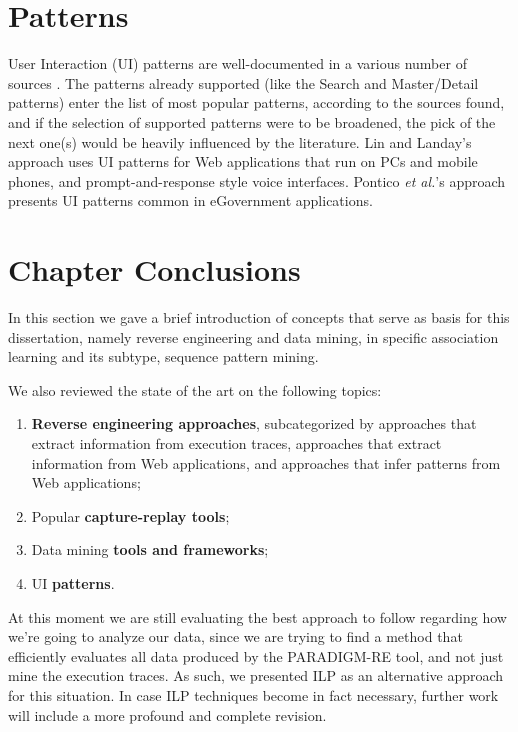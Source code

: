 \section{Patterns}\label{sec:patterns}
User Interaction (UI) patterns are well-documented in a various number of sources \cite{tidwell2010designing,van2001patterns, neil12standard,sinnig2005patterns}. The patterns already supported (like the Search and Master/Detail patterns) enter the list of most popular patterns, according to the sources found, and if the selection of supported patterns were to be broadened, the pick of the next one(s) would be heavily influenced by the literature. Lin and Landay's approach \cite{lin2008employing} uses UI patterns for Web applications that run on PCs and mobile phones, and prompt-and-response style voice interfaces. Pontico \textit{et al.}'s approach \cite{pontico2008organizing} presents UI patterns common in eGovernment applications.

\section{Chapter Conclusions}
In this section we gave a brief introduction of concepts that serve as basis for this dissertation, namely reverse engineering and data mining, in specific association learning and its subtype, sequence pattern mining.

We also reviewed the state of the art on the following topics:
\begin{enumerate}
\item \textbf{Reverse engineering approaches}, subcategorized by approaches that extract information from execution traces, approaches that extract information from Web applications, and approaches that infer patterns from Web applications;
\item Popular \textbf{capture-replay tools};
\item Data mining \textbf{tools and frameworks};
\item UI \textbf{patterns}.
\end{enumerate}

At this moment we are still evaluating the best approach to follow regarding how we're going to analyze our data, since we are trying to find a method that efficiently evaluates all data produced by the PARADIGM-RE tool, and not just mine the execution traces.  As such, we presented ILP as an alternative approach for this situation. In case ILP techniques become in fact necessary, further work will include a more profound and complete
revision.